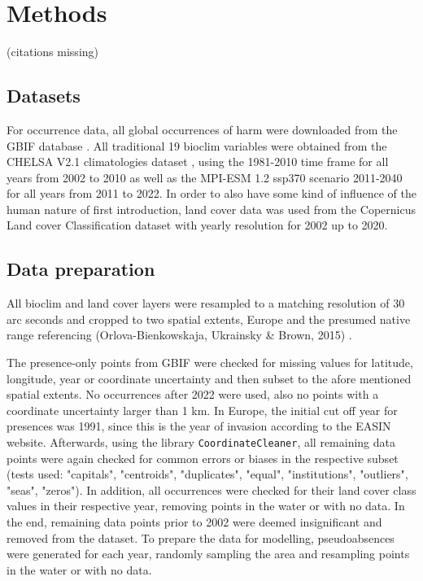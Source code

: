 \documentclass[12pt,a4paper]{article}
\begin{document}
\newpage
\section{Methods}
 (citations missing)
\subsection{Datasets}
For occurrence data, all global occurrences of \gls{harm} were downloaded from the GBIF database \autocite{GBIFaxyridisdataset}.
All traditional 19 bioclim variables were obtained from the CHELSA V2.1 climatologies dataset \autocite{karger2017CHELSApaper, CHELSAbioclimdataset}, using the 1981-2010 time frame for all years from 2002 to 2010 as well as the MPI-ESM 1.2 ssp370 scenario 2011-2040 for all years from 2011 to 2022.
In order to also have some kind of influence of the human nature of first introduction, land cover data was used from the Copernicus Land cover Classification dataset \autocite{COPlandcoverdataset}  with yearly resolution for 2002 up to 2020.

\subsection{Data preparation}
All bioclim and land cover layers were resampled to a matching resolution of 30 arc seconds and cropped to two spatial extents, Europe and the presumed native range referencing (Orlova-Bienkowskaja, Ukrainsky \& Brown, 2015) \autocite{orlova2015harmonia}.

The presence-only points from GBIF were checked for missing values for latitude, longitude, year or coordinate uncertainty and then subset to the afore mentioned spatial extents.
No occurrences after 2022 were used, also no points with a coordinate uncertainty larger than 1 km.
In Europe, the initial cut off year for presences was 1991, since this is the year of invasion according to the EASIN website.
Afterwards, using the library \texttt{CoordinateCleaner}, all remaining data points were again checked for common errors or biases in the respective subset (tests used: "capitals", "centroids", "duplicates", "equal", "institutions", "outliers", "seas", "zeros").
In addition, all occurrences were checked for their land cover class values in their respective year, removing points in the water or with no data.
In the end, remaining data points prior to 2002 were deemed insignificant and removed from the dataset.
To prepare the data for modelling, pseudoabsences were generated for each year, randomly sampling the area and resampling points in the water or with no data.
\end{document}
